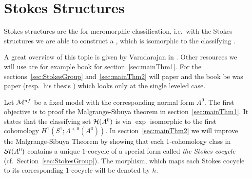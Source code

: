 \chapter{Stokes Structures}\label{chap:stokes}
Stokes structures are the  for meromorphic
classification, i.e.\ with the Stokes structures we are able to construct a
, which is isomorphic to the classifying .

A great overview of this topic is given by Varadarajan in
\cite{Varadarajan96linearmeromorphic}. Other resources we will use are for
example  book \cite[section II]{sabbah2007isomonodromic} for
section~\ref{sec:mainThm1}.
For the sections~\ref{sec:StokesGroup} and~\ref{sec:mainThm2} will
 paper \cite{Loday1994} and the book \cite{Loday2014}
be  was  paper \cite{boalch}
(resp.\ his thesis \cite{thboalch}) which looks only at the single leveled
case.

Let $\mathcal{M}^{nf}$ be a fixed model with the corresponding normal form $A^0$.
The first objective is to proof the Malgrange-Sibuya theorem
in section~\ref{sec:mainThm1}. It states that the classifying set $\mathcal{H}(A^0)$
is via $\exp$ isomorphic to the first cohomology $H^1(S^1;\Lambda^{<0}(A^0))$.
In section~\ref{sec:mainThm2} we will improve the Malgrange-Sibuya Theorem by
showing that each 1-cohomology class in $\mathcal{S}{}t(A^0)$ contains a unique
$1$-cocycle of a special form called \emph{the Stokes cocycle}
(cf.\ Section~\ref{sec:StokesGroup}).
The morphism, which maps each Stokes cocycle to its corresponding $1$-cocycle
will be denoted by $h$.

